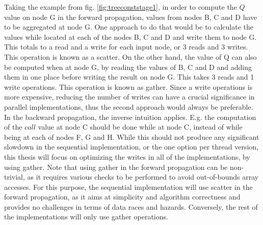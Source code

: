 Taking the example from fig. \ref{fig:treeconststage1}, in order to compute the $Q$ value on node G in the forward propagation, values from nodes B, C and D have to be aggregated at node G. One approach to do that would be to calculate the values while located at each of the nodes B, C and D and write them to node G. This totals to a read and a write for each input node, or 3 reads and 3 writes. This operation is known as a scatter. On the other hand, the value of Q can also be computed when at node G, by reading the values of B, C and D and adding them in one place before writing the result on node G. This takes 3 reads and 1 write operations. This operation is known as gather. Since a write operations is more expensive, reducing the number of writes can have a crucial significance in parallel implementations, thus the second approach would always be preferable. In the backward propagation, the inverse intuition applies. E.g. the computation of the $call$ value at node C should be done while at node C, instead of while being at each of nodes F, G and H. While this should not produce any significant slowdown in the sequential implementation, or the one option per thread version, this thesis will focus on optimizing the writes in all of the implementations, by using gather. Note that using gather in the forward propagation can be non-trivial, as it requires various checks to be performed to avoid out-of-bounds array accesses. For this purpose, the sequential implementation will use scatter in the forward propagation, as it aims at simplicity and algorithm correctness and provides no challenges in terms of data races and hazards. Conversely, the rest of the implementations will only use gather operations.   